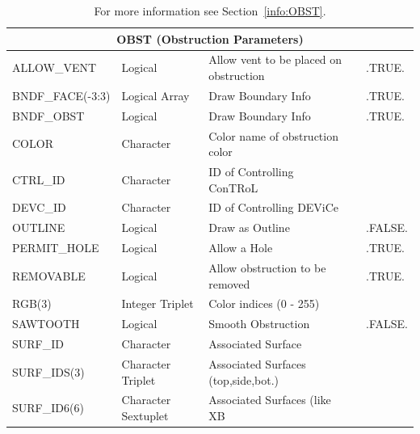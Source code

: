 \documentclass[11pt]{book}
\begin{document}
\hspace{1in}

\begin{table}[H]
\caption{For more information see Section~\ref{info:OBST}.}\label{tbl:OBST}
\noindent
\begin{tabular*}{\textwidth}{@{\extracolsep{\fill}}|l|l|l|l|l|}
\hline
\multicolumn{5}{|c|}{{\ct OBST} (Obstruction Parameters)} \\ \hline \hline
{\ct ALLOW\_VENT}         & Logical             & Allow vent to be placed on obstruction&    & {\ct .TRUE.}  \\ \hline
{\ct BNDF\_FACE(-3:3)}    & Logical Array       & Draw Boundary Info                    &    & {\ct .TRUE.}  \\ \hline
{\ct BNDF\_OBST}          & Logical             & Draw Boundary Info                    &    & {\ct .TRUE.}  \\ \hline
{\ct COLOR    }           & Character           & Color name of obstruction color       &    &               \\ \hline
{\ct CTRL\_ID }           & Character           & {\ct ID} of Controlling {\ct ConTRoL} &    &               \\ \hline
{\ct DEVC\_ID }           & Character           & {\ct ID} of Controlling {\ct DEViCe}  &    &               \\ \hline
{\ct OUTLINE}             & Logical             & Draw as Outline                       &    & {\ct .FALSE.} \\ \hline
{\ct PERMIT\_HOLE}        & Logical             & Allow a Hole                          &    & {\ct .TRUE.}  \\ \hline
{\ct REMOVABLE}           & Logical             & Allow obstruction to be removed       &    & {\ct .TRUE.}  \\ \hline
{\ct RGB(3)}              & Integer Triplet     & Color indices (0 - 255)               &    &               \\ \hline
{\ct SAWTOOTH}            & Logical             & Smooth Obstruction                    &    & {\ct .FALSE.} \\ \hline
{\ct SURF\_ID}            & Character           & Associated Surface                    &    &               \\ \hline
{\ct SURF\_IDS(3)}        & Character Triplet   & Associated Surfaces (top,side,bot.)   &    &               \\ \hline
{\ct SURF\_ID6(6)}        & Character Sextuplet & Associated Surfaces (like {\ct XB}    &    &               \\ \hline

\end{tabular*}
\end{table}
\end{document}
